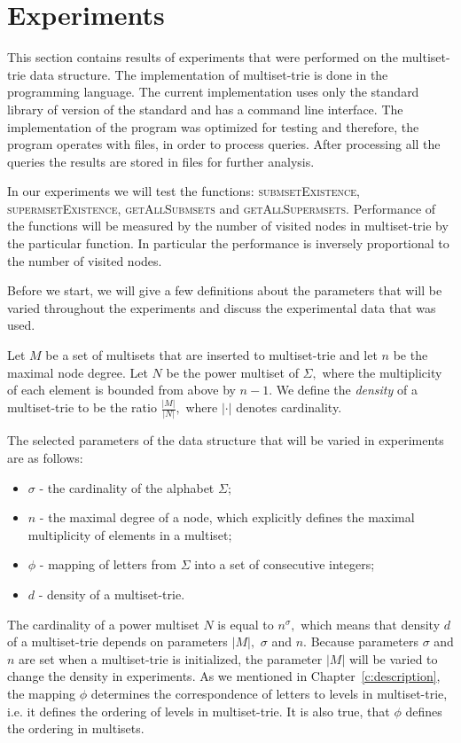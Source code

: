 \section{Experiments} \label{c:experiments}

%
This section contains results of experiments that were performed on the multiset-trie 
data structure. The implementation of multiset-trie is done in the \CC 
{ programming} language. The current implementation uses only the standard 
library of  version of the standard and has a command line interface. The implementation 
of the program was optimized for testing and therefore, the program operates 
with files, in order to process queries. After processing all the queries 
the results are stored in files for further analysis.

In our experiments we will test the functions: \textsc{submsetExistence}, 
\textsc{supermsetExistence}, \textsc{getAllSubmsets} and 
\textsc{getAllSupermsets}. Performance of the functions will be measured by 
the number of visited nodes in multiset-trie by the particular function. In 
particular the performance is inversely proportional to the number of visited 
nodes.

Before we start, we will give a few definitions about the parameters 
that will be varied throughout the experiments and discuss the experimental data 
that was used.

Let $M$ be a set of multisets that are inserted to multiset-trie and let $n$ be 
the maximal node degree. Let $N$ be the power multiset of $\Sigma,$ where 
the multiplicity of each element is bounded from above by $n-1.$ We define the 
\emph{density} of a multiset-trie to be the ratio $\frac{|M|}{|N|},$ where 
$|\cdot|$ denotes cardinality.

The selected parameters of the data structure that will be varied in experiments 
are as follows:
%
\begin{itemize}
\item $\sigma$ - the cardinality of the alphabet $\Sigma;$
%
\item $n$ - the maximal degree of a node, which explicitly defines the maximal 
multiplicity of elements in a multiset;
%
\item $\phi$ - mapping of letters from $\Sigma$ into a set of consecutive 
integers;
%
\item $d$ - density of a multiset-trie.
%
\end{itemize}
The cardinality of a power multiset $N$ is equal to $n^\sigma,$ which means that 
density $d$ of a multiset-trie depends on parameters $|M|,$ $\sigma$ and $n.$ 
Because parameters $\sigma$ and $n$ are set when a multiset-trie is initialized, 
the parameter $|M|$ will be varied to change the density in experiments. As we 
mentioned in Chapter~\ref{c:description}, the mapping $\phi$ determines the 
correspondence of letters to levels in multiset-trie, i.e. it defines the ordering of 
levels in multiset-trie. It is also true, that $\phi$ defines the ordering in multisets.

